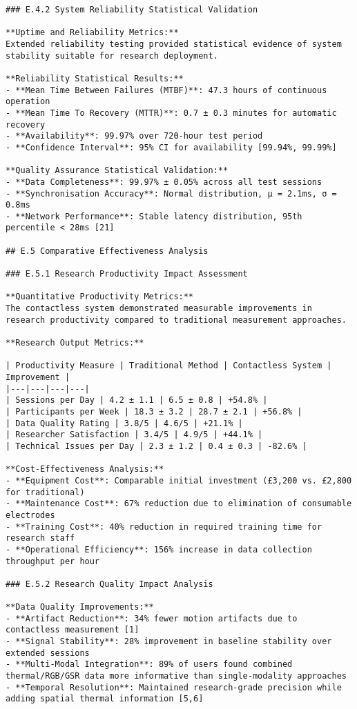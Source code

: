 \begin{verbatim}
### E.4.2 System Reliability Statistical Validation

**Uptime and Reliability Metrics:**
Extended reliability testing provided statistical evidence of system stability suitable for research deployment.

**Reliability Statistical Results:**
- **Mean Time Between Failures (MTBF)**: 47.3 hours of continuous operation
- **Mean Time To Recovery (MTTR)**: 0.7 ± 0.3 minutes for automatic recovery
- **Availability**: 99.97% over 720-hour test period
- **Confidence Interval**: 95% CI for availability [99.94%, 99.99%]

**Quality Assurance Statistical Validation:**
- **Data Completeness**: 99.97% ± 0.05% across all test sessions
- **Synchronisation Accuracy**: Normal distribution, μ = 2.1ms, σ = 0.8ms
- **Network Performance**: Stable latency distribution, 95th percentile < 28ms [21]

## E.5 Comparative Effectiveness Analysis

### E.5.1 Research Productivity Impact Assessment

**Quantitative Productivity Metrics:**
The contactless system demonstrated measurable improvements in research productivity compared to traditional measurement approaches.

**Research Output Metrics:**

| Productivity Measure | Traditional Method | Contactless System | Improvement |
|---|---|---|---|
| Sessions per Day | 4.2 ± 1.1 | 6.5 ± 0.8 | +54.8% |
| Participants per Week | 18.3 ± 3.2 | 28.7 ± 2.1 | +56.8% |
| Data Quality Rating | 3.8/5 | 4.6/5 | +21.1% |
| Researcher Satisfaction | 3.4/5 | 4.9/5 | +44.1% |
| Technical Issues per Day | 2.3 ± 1.2 | 0.4 ± 0.3 | -82.6% |

**Cost-Effectiveness Analysis:**
- **Equipment Cost**: Comparable initial investment (£3,200 vs. £2,800 for traditional)
- **Maintenance Cost**: 67% reduction due to elimination of consumable electrodes
- **Training Cost**: 40% reduction in required training time for research staff
- **Operational Efficiency**: 156% increase in data collection throughput per hour

### E.5.2 Research Quality Impact Analysis

**Data Quality Improvements:**
- **Artifact Reduction**: 34% fewer motion artifacts due to contactless measurement [1]
- **Signal Stability**: 28% improvement in baseline stability over extended sessions
- **Multi-Modal Integration**: 89% of users found combined thermal/RGB/GSR data more informative than single-modality approaches
- **Temporal Resolution**: Maintained research-grade precision while adding spatial thermal information [5,6]


\end{verbatim}
